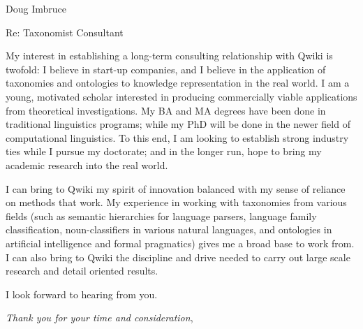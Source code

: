 \documentclass[a4paper,10pt]{letter}
\begin{document}

\begin{letter}{Doug Imbruce}
\address{Joshua Bowles}

\opening{Re: Taxonomist Consultant}


My interest in establishing a long-term consulting relationship with Qwiki is twofold: I believe in start-up companies, and I believe in the application of taxonomies and ontologies to knowledge representation in the real world. I am a young, motivated scholar interested in producing commercially viable applications from theoretical investigations. My BA and MA degrees have been done in traditional linguistics programs; while my PhD will be done in the newer field of computational linguistics. To this end, I am looking to establish strong industry ties while I pursue my doctorate; and in the longer run, hope to bring my academic research into the real world.

I can bring to Qwiki my spirit of innovation balanced with my sense of reliance on methods that work. My experience in working with taxonomies from various fields (such as semantic hierarchies for language parsers, language family classification, noun-classifiers in various natural languages, and ontologies in artificial intelligence and formal pragmatics) gives me a broad base to work from. I can also bring to Qwiki the discipline and drive needed to carry out large scale research and detail oriented results. 

I look forward to hearing from you. 


\signature{Joshua Bowles}

\closing{\textsl{Thank you for your time and consideration},}


\end{letter}
\end{document}
